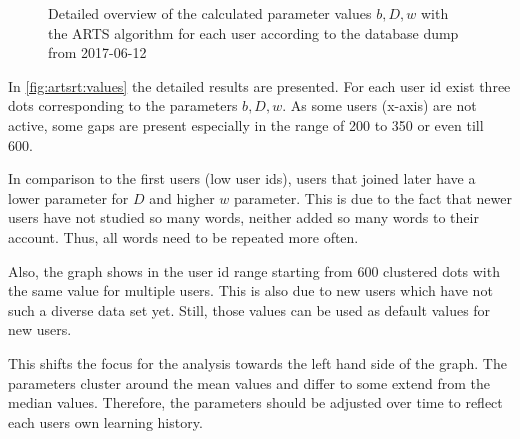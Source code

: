 \documentclass{article}
\begin{document}
\begin{figure}[H]
\caption{Detailed overview of the calculated parameter values $b, D, w$ with the ARTS algorithm for each user according to the database dump from 2017-06-12}
\label{fig:artsrt:values}
\end{figure}

In \autoref{fig:artsrt:values} the detailed results are presented. For each user id exist three dots corresponding to the parameters $b, D, w$. As some users (x-axis) are not active, some gaps are present especially in the range of 200 to 350 or even till 600.

In comparison to the first users (low user ids), users that joined later have a lower parameter for $D$ and higher $w$ parameter. This is due to the fact that newer users have not studied so many words, neither added so many words to their account. Thus, all words need to be repeated more often.

Also, the graph shows in the user id range starting from 600 clustered dots with the same value for multiple users. This is also due to new users which have not such a diverse data set yet. Still, those values can be used as default values for new users.

This shifts the focus for the analysis towards the left hand side of the graph. The parameters cluster around the mean values and differ to some extend from the median values. Therefore, the parameters should be adjusted over time to reflect each users own learning history.
\end{document}
